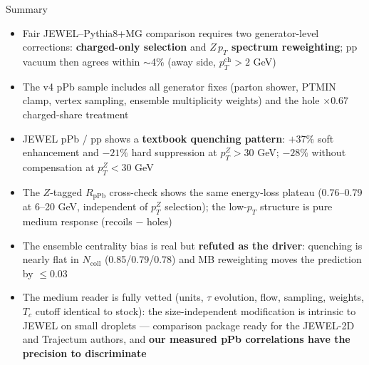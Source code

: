 \documentclass[aspectratio=169]{beamer}
\begin{document}
\begin{frame}[t]{Summary}
  \begin{itemize}
    \item Fair JEWEL--Pythia8+MG comparison requires two generator-level corrections: \textbf{charged-only selection} and \textbf{$Z\,p_T$ spectrum reweighting}; pp vacuum then agrees within $\sim$4\% (away side, $p_T^\mathrm{ch}>2$ GeV)
    \item The v4 pPb sample includes all generator fixes (parton shower, PTMIN clamp, vertex sampling, ensemble multiplicity weights) and the hole $\times$0.67 charged-share treatment
    \item JEWEL pPb / pp shows a \textbf{textbook quenching pattern}: $+37\%$ soft enhancement and $-21\%$ hard suppression at $p_T^Z > 30$ GeV; $-28\%$ without compensation at $p_T^Z < 30$ GeV
    \item The $Z$-tagged $R_\mathrm{pPb}$ cross-check shows the same energy-loss plateau (0.76--0.79 at 6--20 GeV, independent of $p_T^Z$ selection); the low-$p_T$ structure is pure medium response (recoils $-$ holes)
    \item The ensemble centrality bias is real but \textbf{refuted as the driver}: quenching is nearly flat in $N_\mathrm{coll}$ (0.85/0.79/0.78) and MB reweighting moves the prediction by $\le 0.03$
    \item The medium reader is fully vetted (units, $\tau$ evolution, flow, sampling, weights, $T_c$ cutoff identical to stock): the size-independent modification is intrinsic to JEWEL on small droplets --- comparison package ready for the JEWEL-2D and Trajectum authors, and \textbf{our measured pPb correlations have the precision to discriminate}
  \end{itemize}
\end{frame}
\end{document}
